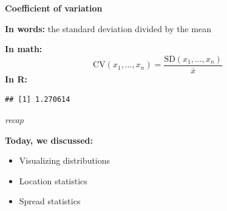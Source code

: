 \documentclass[ignorenonframetext,]{beamer}
\newenvironment{Shaded}{\begin{snugshade}}{\end{snugshade}}
\newcommand{\KeywordTok}[1]{\textcolor[rgb]{0.13,0.29,0.53}{\textbf{#1}}}
\newcommand{\NormalTok}[1]{#1}
\newcommand{\OperatorTok}[1]{\textcolor[rgb]{0.81,0.36,0.00}{\textbf{#1}}}
\newcommand{\StringTok}[1]{\textcolor[rgb]{0.31,0.60,0.02}{#1}}
\begin{document}
\begin{frame}[fragile]{}
\protect\hypertarget{section-51}{}

\textbf{\large Coefficient of variation}

\vspace{2ex}

\textbf{In words:} the standard deviation divided by the mean

\vspace{2ex}

\textbf{In math:}
\[\textrm{CV}(x_1,\ldots, x_n)=\frac{\textrm{SD}(x_1,\ldots, x_n)}{\overline{x}}\]
\vspace{2ex}\textbf{In R:}

\vspace{1ex}\scriptsize

\begin{Shaded}
\end{Shaded}

\begin{verbatim}
## [1] 1.270614
\end{verbatim}

\end{frame}

\begin{frame}[standout]{}
\protect\hypertarget{section-52}{}

\color{apricot}\textit{\gar\Huge recap}

\normalsize\color{white}\vspace{4ex}\textbf{Today, we discussed:}

\vspace{2ex}
\begin{itemize}
\color{white}
\setlength{\itemsep}{2ex}
\item Visualizing distributions
\item Location statistics
\item Spread statistics
\end{itemize}

\end{frame}
\end{document}
